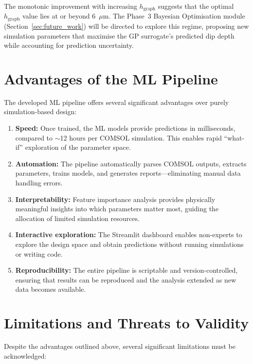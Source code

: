 \documentclass[12pt,a4paper]{report}
\begin{document}
The monotonic improvement with increasing $h_{\text{graph}}$ suggests that the optimal $h_{\text{graph}}$ value lies at or beyond 6~$\mu$m. The Phase~3 Bayesian Optimisation module (Section~\ref{sec:future_work}) will be directed to explore this regime, proposing new simulation parameters that maximise the GP surrogate's predicted dip depth while accounting for prediction uncertainty.

\section{Advantages of the ML Pipeline}
\label{sec:advantages}

The developed ML pipeline offers several significant advantages over purely simulation-based design:

\begin{enumerate}[leftmargin=2cm]
    \item \textbf{Speed:} Once trained, the ML models provide predictions in milliseconds, compared to $\sim$12 hours per COMSOL simulation. This enables rapid ``what-if'' exploration of the parameter space.
    \item \textbf{Automation:} The pipeline automatically parses COMSOL outputs, extracts parameters, trains models, and generates reports---eliminating manual data handling errors.
    \item \textbf{Interpretability:} Feature importance analysis provides physically meaningful insights into which parameters matter most, guiding the allocation of limited simulation resources.
    \item \textbf{Interactive exploration:} The Streamlit dashboard enables non-experts to explore the design space and obtain predictions without running simulations or writing code.
    \item \textbf{Reproducibility:} The entire pipeline is scriptable and version-controlled, ensuring that results can be reproduced and the analysis extended as new data becomes available.
\end{enumerate}

\section{Limitations and Threats to Validity}
\label{sec:limitations}

Despite the advantages outlined above, several significant limitations must be acknowledged:
\end{document}
